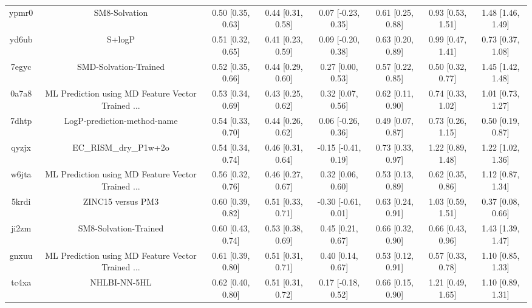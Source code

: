 \documentclass{article}
\begin{document}
\begin{center}
\begin{longtable}{|cccccccc|}
 ypmr0 &                                      SM8-Solvation &  0.50 [0.35, 0.63] &  0.44 [0.31, 0.58] &    0.07 [-0.23, 0.35] &  0.61 [0.25, 0.88] &    0.93 [0.53, 1.51] &     1.48 [1.46, 1.49] \\
 yd6ub &                                             S+logP &  0.51 [0.32, 0.65] &  0.41 [0.23, 0.59] &    0.09 [-0.20, 0.38] &  0.63 [0.20, 0.89] &    0.99 [0.47, 1.41] &     0.73 [0.37, 1.08] \\
 7egyc &                              SMD-Solvation-Trained &  0.52 [0.35, 0.66] &  0.44 [0.29, 0.60] &     0.27 [0.00, 0.53] &  0.57 [0.22, 0.85] &    0.50 [0.32, 0.77] &     1.45 [1.42, 1.48] \\
 0a7a8 &  ML Prediction using MD Feature Vector Trained ... &  0.53 [0.34, 0.69] &  0.43 [0.25, 0.62] &     0.32 [0.07, 0.56] &  0.62 [0.11, 0.90] &    0.74 [0.33, 1.02] &     1.01 [0.73, 1.27] \\
 7dhtp &                        LogP-prediction-method-name &  0.54 [0.33, 0.70] &  0.44 [0.26, 0.62] &    0.06 [-0.26, 0.36] &  0.49 [0.07, 0.87] &    0.73 [0.26, 1.15] &     0.50 [0.19, 0.87] \\
 qyzjx &                              EC\_RISM\_dry\_P1w+2o &  0.54 [0.34, 0.74] &  0.46 [0.31, 0.64] &   -0.15 [-0.41, 0.19] &  0.73 [0.33, 0.97] &    1.22 [0.89, 1.48] &     1.22 [1.02, 1.36] \\
 w6jta &  ML Prediction using MD Feature Vector Trained ... &  0.56 [0.32, 0.76] &  0.46 [0.27, 0.67] &     0.32 [0.06, 0.60] &  0.53 [0.13, 0.89] &    0.62 [0.35, 0.86] &     1.12 [0.87, 1.34] \\
 5krdi &                                  ZINC15 versus PM3 &  0.60 [0.39, 0.82] &  0.51 [0.33, 0.71] &   -0.30 [-0.61, 0.01] &  0.63 [0.24, 0.91] &    1.03 [0.59, 1.51] &     0.37 [0.08, 0.66] \\
 ji2zm &                              SM8-Solvation-Trained &  0.60 [0.43, 0.74] &  0.53 [0.38, 0.69] &     0.45 [0.21, 0.67] &  0.66 [0.32, 0.90] &    0.66 [0.43, 0.96] &     1.43 [1.39, 1.47] \\
 gnxuu &  ML Prediction using MD Feature Vector Trained ... &  0.61 [0.39, 0.80] &  0.51 [0.31, 0.71] &     0.40 [0.14, 0.67] &  0.53 [0.12, 0.91] &    0.57 [0.33, 0.78] &     1.10 [0.85, 1.33] \\
 tc4xa &                                       NHLBI-NN-5HL &  0.62 [0.40, 0.80] &  0.51 [0.31, 0.72] &    0.17 [-0.18, 0.52] &  0.66 [0.15, 0.90] &    1.21 [0.49, 1.65] &     1.10 [0.89, 1.31] \\

\end{longtable}
\end{center}
\end{document}
